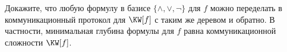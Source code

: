 Докажите, что любую формулу в базисе $\{\land, \lor, \neg\}$ для $f$ можно переделать в коммуникационный
протокол для $\KW[f]$ с таким же деревом и обратно. В частности, минимальная глубина формулы для $f$ равна
коммуникационной сложности $\KW[f]$.
